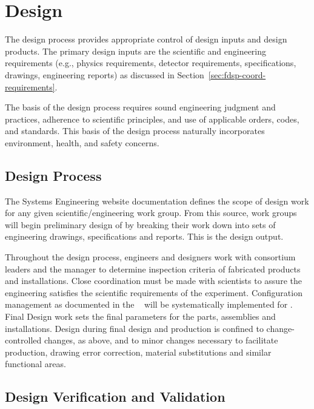 \section{Design}

The  design process provides appropriate control of design
inputs and design products. The primary design inputs are the
 scientific and engineering requirements (e.g., physics
requirements, detector requirements, specifications, drawings,
engineering reports) as discussed in
Section~\ref{sec:fdsp-coord-requirements}.

The basis of the design process requires sound engineering judgment
and practices, adherence to scientific principles, and use of
applicable orders, codes, and standards. This basis of the design
process naturally incorporates environment, health, and safety
concerns.

\subsection{Design Process}

The  Systems Engineering website
documentation defines the scope of design work for any given
scientific/engineering work group. From this source, work groups
will begin preliminary design of  by breaking their work
down into sets of engineering drawings, specifications and
reports. This is the design output.

Throughout the design process, engineers and designers work with
consortium leaders and the   manager to
determine  inspection criteria of fabricated products and
installations. Close coordination must be made with 
scientists to assure the engineering satisfies the scientific
requirements of the experiment. Configuration management as documented
in the  ~\cite{bib:docdb82} will be
systematically implemented for . Final Design work sets
the final  parameters for the parts, assemblies and
installations. Design during final design and production is confined
to change-controlled changes, as above, and to minor changes necessary
to facilitate production, drawing error correction, material
substitutions and similar functional areas.

\subsection{Design Verification and Validation}
\label{sec:verification}

